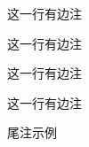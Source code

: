\documentclass[twoside]{ctexart}
\begin{document}
            
            

            这一行有边注

            {这一行有边注
            \reversemarginpar
            
            这一行有边注
            
            }

            这一行有边注


            尾注示例
            
\end{document}

